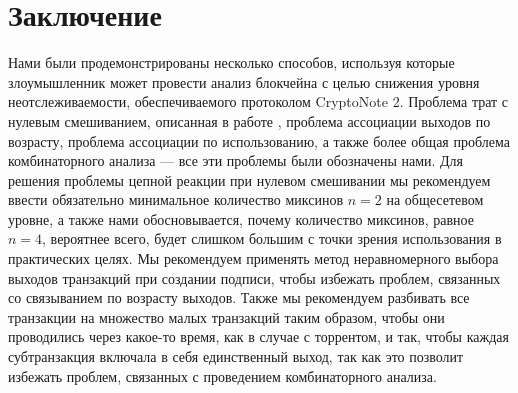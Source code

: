 \documentclass{mrl}
\begin{document}
\section{Заключение}\label{conclusion}

Нами были продемонстрированы несколько способов, используя которые злоумышленник может провести анализ блокчейна с целью снижения уровня неотслеживаемости, обеспечиваемого протоколом CryptoNote 2. Проблема трат с нулевым смешиванием, описанная в работе \cite{chainReactions}, проблема ассоциации выходов по возрасту, проблема ассоциации по использованию, а также более общая проблема комбинаторного анализа — все эти проблемы были обозначены нами. Для решения проблемы цепной реакции при нулевом смешивании мы рекомендуем ввести обязательно минимальное количество миксинов $n=2$ на общесетевом уровне, а также нами обосновывается, почему количество миксинов, равное $n=4$, вероятнее всего, будет слишком большим с точки зрения использования в практических целях. Мы рекомендуем применять метод неравномерного выбора выходов транзакций при создании подписи, чтобы избежать проблем, связанных со связыванием по возрасту выходов. Также мы рекомендуем разбивать все транзакции на множество малых транзакций таким образом, чтобы они проводились через какое-то время, как в случае с торрентом, и так, чтобы каждая субтранзакция включала в себя единственный выход, так как это позволит избежать проблем, связанных с проведением комбинаторного анализа.



\end{document}
